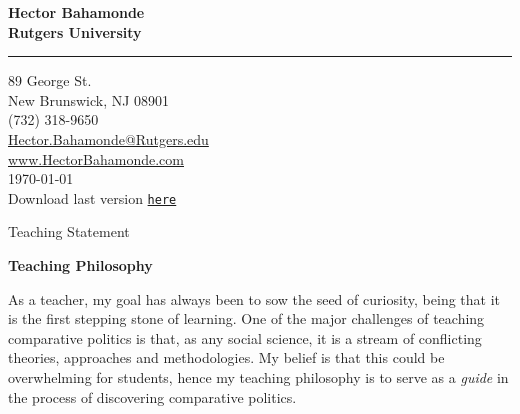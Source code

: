 \documentclass[11pt]{letter} %
\date{}
\begin{document}

\begin{letter}{} 


\begin{center}
\large\bf Hector Bahamonde \\ %
Rutgers University\\
\vspace{20pt} \hrule height 1pt %
89 George St. \\ New Brunswick, NJ 08901 \\ (732) 318-9650 \\ 
{\normalfont\normalsize\href{mailto:hector.bahamonde@rutgers.edu}{Hector.Bahamonde@Rutgers.edu}} \\
{\normalfont\normalsize\href{http://www.hectorbahamonde.com}{www.HectorBahamonde.com}}\\
{\normalfont \scriptsize{
\vspace{5mm}\today\\
Download last version \href{http://github.com/hbahamonde/Job_Market/raw/master/Bahamonde_Teaching_Statement.pdf}{\texttt{here}}}} %


{\huge\vspace{8mm} Teaching Statement}
\end{center} 

\signature{\vspace{1cm}h.b., fall 2016} %

\opening{} 
 
 {\bf Teaching Philosophy}

As a teacher, my goal has always been to sow the seed of curiosity, being that it is the first stepping stone of learning. One of the major challenges of teaching comparative politics is that, as any social science, it is a stream of conflicting theories, approaches and methodologies. My belief is that this could be overwhelming for students, hence my teaching philosophy is to serve as a \emph{guide} in the process of discovering comparative politics.


\end{letter}
\end{document}
